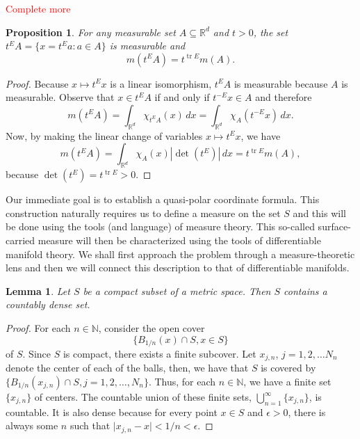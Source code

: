 \documentclass[11pt]{article}
\theoremstyle{theorem}
\newtheorem{lemma}[theorem]{Lemma}
\newtheorem{proposition}[theorem]{Proposition}
\newcommand\tr{\operatorname{tr}}
\renewcommand\det{\operatorname{det}}
\begin{document}
\textcolor{red}{Complete more}

\begin{proposition}\label{prop:Scaling}
For any measurable set $A\subseteq\mathbb{R}^d$ and $t>0$, the set $t^E A=\{x=t^E a:a\in A\}$ is measurable and
\begin{equation*}
m(t^E A)=t^{\tr E}m(A).
\end{equation*}
\end{proposition}
\begin{proof}
Because $x\mapsto t^E x$ is a linear isomorphism, $t^E A$ is measurable because $A$ is measurable. Observe that $x\in t^E A$ if and only if $t^{-E}x\in A$ and therefore
\begin{equation*}
m(t^E A)=\int_{\mathbb{R}^d}\chi_{t^E A}(x)\,dx=\int_{\mathbb{R}^d}\chi_{A}(t^{-E}x)\,dx.
\end{equation*}
Now, by making the linear change of variables $x\mapsto t^E x$, we have
\begin{equation*}
m(t^E A)=\int_{\mathbb{R}^d}\chi_A(x)|\det(t^E)|\,dx=t^{\tr E}m(A),
\end{equation*}
because $\det(t^E)=t^{\tr E}>0$.
\end{proof}

\noindent Our immediate goal is to establish a quasi-polar coordinate formula. This construction naturally requires us to define a measure on the set $S$ and this will be done using the tools (and language) of measure theory. This so-called surface-carried measure will then be characterized using the tools of differentiable manifold theory. We shall first approach the problem through a measure-theoretic lens and then we will connect this description to that of differentiable manifolds.

\begin{lemma}
Let $S$ be a compact subset of a metric space. Then $S$ contains a countably dense set.
\end{lemma}
\begin{proof}
For each $n\in\mathbb{N}$, consider the open cover
\begin{equation*}
\{B_{1/n}(x)\cap S, x\in S\}
\end{equation*}
of $S$. Since $S$ is compact, there exists a finite subcover. Let $x_{j,n}$, $j=1,2,\dots N_n$ denote the center of each of the balls, then, we have that $S$ is covered by $\{B_{1/n}(x_{j,n})\cap S,j=1,2,\dots, N_n\}$. Thus, for each $n\in \mathbb{N}$, we have a finite set $\{x_{j,n}\}$ of centers. The countable union of these finite sets, $\bigcup^\infty_{n=1} \{ x_{j,n}\}$, is countable. It is also dense because for every point $x\in S$ and $\epsilon >0$, there is always some $n$ such that $\vert x_{j,n} - x\vert < 1/n < \epsilon$.  
\end{proof}
\end{document}
